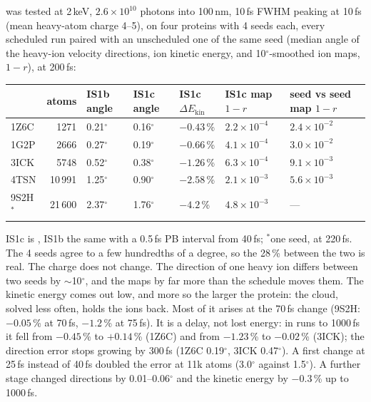  was tested at 2\,keV, $2.6\times10^{10}$ photons into 100\,nm, 10\,fs FWHM peaking at 10\,fs
(mean heavy-atom charge 4--5), on four proteins with 4 seeds each, every scheduled run paired with an unscheduled
one of the same seed (median angle of the heavy-ion velocity directions, ion kinetic energy, and 10$^\circ$-smoothed
ion maps, $1-r$), at 200\,fs:
\begin{table}[H]
\centering\small
\begin{tabular}{@{}lrlllll@{}}
\toprule
& atoms & IS1b angle & IS1c angle & IS1c $\Delta E_{\mathrm{kin}}$ & IS1c map $1-r$ & seed vs seed map $1-r$ \\ \midrule
1Z6C & 1271 & 0.21$^\circ$ & 0.16$^\circ$ & $-0.43$\,\% & $2.2\times10^{-4}$ & $2.4\times10^{-2}$ \\
1G2P & 2666 & 0.27$^\circ$ & 0.19$^\circ$ & $-0.66$\,\% & $4.1\times10^{-4}$ & $3.0\times10^{-2}$ \\
3ICK & 5748 & 0.52$^\circ$ & 0.38$^\circ$ & $-1.26$\,\% & $6.3\times10^{-4}$ & $9.1\times10^{-3}$ \\
4TSN & 10\,991 & 1.25$^\circ$ & 0.90$^\circ$ & $-2.58$\,\% & $2.1\times10^{-3}$ & $5.6\times10^{-3}$ \\
9S2H$^*$ & 21\,600 & 2.37$^\circ$ & 1.76$^\circ$ & $-4.2$\,\% & $4.8\times10^{-3}$ & --- \\
\bottomrule
\end{tabular}
\end{table}
\noindent IS1c is , IS1b the same with a 0.5\,fs PB interval from 40\,fs;
$^*$one seed, at 220\,fs.
The 4 seeds agree to a few hundredths of a degree, so the 28\,\% between the two is real.
The charge does not change.
The direction of one heavy ion differs between two seeds by $\sim$10$^\circ$, and the maps by far more than the
schedule moves them.
The kinetic energy comes out low, and more so the larger the protein: the cloud, solved less often, holds the ions
back.
Most of it arises at the 70\,fs change (9S2H: $-0.05$\,\% at 70\,fs, $-1.2$\,\% at 75\,fs).
It is a delay, not lost energy: in runs to 1000\,fs it fell from $-0.45$\,\% to $+0.14$\,\% (1Z6C) and from
$-1.23$\,\% to $-0.02$\,\% (3ICK); the direction error stops growing by 300\,fs (1Z6C 0.19$^\circ$, 3ICK 0.47$^\circ$).
A first change at 25\,fs instead of 40\,fs doubled the error at 11k atoms (3.0$^\circ$ against 1.5$^\circ$).
A further stage  changed directions by 0.01--0.06$^\circ$ and the kinetic energy by $-0.3$\,\% up to
1000\,fs.

